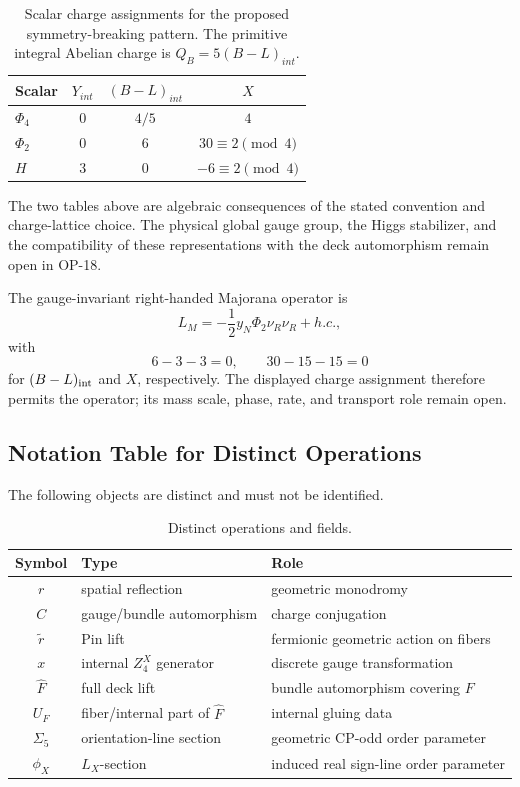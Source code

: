 \documentclass[11pt]{article}
\theoremstyle{canonmath}
\theoremstyle{canonpostulate}
\theoremstyle{canonclaim}
\def\mathrm#1{#1}%
\def\mathbb#1{#1}%
\def\mathcal#1{#1}%
\begin{document}
\begin{table}[H]
\centering
\caption{Scalar charge assignments for the proposed symmetry-breaking pattern. The primitive integral Abelian charge is $Q_B=5(B-L)_{\mathrm{int}}$.}
\begin{tabular}{@{}lccc@{}}
\toprule
\textbf{Scalar} & $Y_{\mathrm{int}}$ & $(B-L)_{\mathrm{int}}$ & $X$ \\
\midrule
$\Phi_4$ & $0$ & $4/5$ & $4$ \\
$\Phi_2$ & $0$ & $6$ & $30 \equiv 2 \pmod 4$ \\
$H$ & $3$ & $0$ & $-6 \equiv 2 \pmod 4$ \\
\bottomrule
\end{tabular}
\end{table}

The two tables above are algebraic consequences of the stated convention and charge-lattice choice. The physical global gauge group, the Higgs stabilizer, and the compatibility of these representations with the deck automorphism remain open in OP-18.

The gauge-invariant right-handed Majorana operator is
\begin{equation}
\mathcal L_M=-\frac12y_N\Phi_2\nu_R\nu_R+\mathrm{h.c.},
\label{eq:majorana}
\end{equation}
with
\begin{equation}
6-3-3=0,\qquad 30-15-15=0
\end{equation}
for $(B-L)_{\rm int}$ and $X$, respectively. The displayed charge assignment therefore permits the operator; its mass scale, phase, rate, and transport role remain open.

\subsection{Notation Table for Distinct Operations}

The following objects are distinct and must not be identified.

\begin{table}[H]
\centering
\caption{Distinct operations and fields.}
\begin{tabular}{@{}cll@{}}
\toprule
\textbf{Symbol} & \textbf{Type} & \textbf{Role} \\
\midrule
$r$ & spatial reflection & geometric monodromy \\
$C$ & gauge/bundle automorphism & charge conjugation \\
$\widetilde r$ & Pin lift & fermionic geometric action on fibers \\
$x$ & internal $\mathbb Z_4^X$ generator & discrete gauge transformation \\
$\widehat F$ & full deck lift & bundle automorphism covering $F$ \\
$U_F$ & fiber/internal part of $\widehat F$ & internal gluing data \\
$\Sigma_5$ & orientation-line section & geometric CP-odd order parameter \\
$\phi_X$ & $L_X$-section & induced real sign-line order parameter \\
\bottomrule
\end{tabular}
\end{table}
\end{document}
